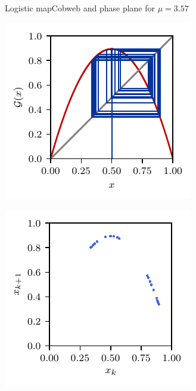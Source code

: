 \documentclass[usenames,dvipsnames,svgnames,10pt,aspectratio=169]{beamer}
\begin{document}
\begin{frame}[t, c]{Logistic map}{Cobweb and phase plane for $\mu = 3.57$}
	\begin{minipage}{.48\textwidth}
		\centering
		\includegraphics[width=.75\textwidth]{logistic_map_cobweb_plot_8}
	\end{minipage}%
	\begin{minipage}{.48\textwidth}
		\centering
		\includegraphics[width=.75\textwidth]{logistic_map_phase_plane_8}
	\end{minipage}

	\vspace{1cm}
\end{frame}
\end{document}
